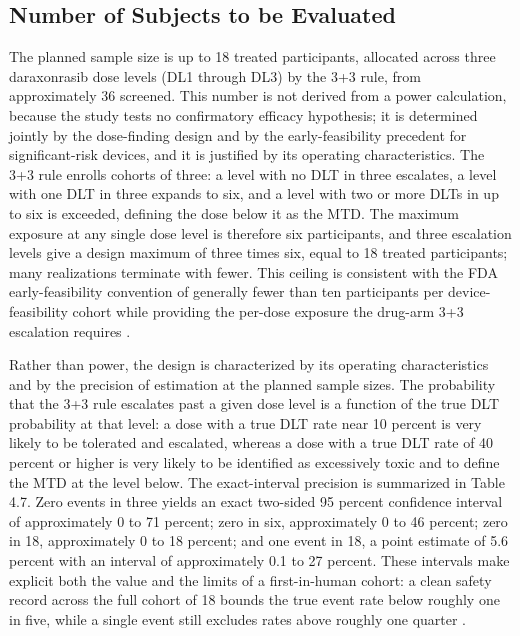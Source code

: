 \subsection{Number of Subjects to be Evaluated}

The planned sample size is up to 18 treated participants, allocated across three
daraxonrasib dose levels (DL1 through DL3) by the 3+3 rule, from approximately 36
screened. This number is not derived from a power calculation, because the study
tests no confirmatory efficacy hypothesis; it is determined jointly by the
dose-finding design and by the early-feasibility precedent for significant-risk
devices, and it is justified by its operating characteristics. The 3+3 rule enrolls
cohorts of three: a level with no DLT in three escalates, a level with one DLT in
three expands to six, and a level with two or more DLTs in up to six is exceeded,
defining the dose below it as the MTD. The maximum exposure at any single dose level
is therefore six participants, and three escalation levels give a design maximum of
three times six, equal to 18 treated participants; many realizations terminate with
fewer. This ceiling is consistent with the FDA early-feasibility convention of
generally fewer than ten participants per device-feasibility cohort while providing
the per-dose exposure the drug-arm 3+3 escalation requires \cite{phase1guidance}.

Rather than power, the design is characterized by its operating characteristics and
by the precision of estimation at the planned sample sizes. The probability that the
3+3 rule escalates past a given dose level is a function of the true DLT probability
at that level: a dose with a true DLT rate near 10 percent is very likely to be
tolerated and escalated, whereas a dose with a true DLT rate of 40 percent or higher
is very likely to be identified as excessively toxic and to define the MTD at the
level below. The exact-interval precision is summarized in Table 4.7. Zero events in
three yields an exact two-sided 95 percent confidence interval of approximately 0 to
71 percent; zero in six, approximately 0 to 46 percent; zero in 18, approximately 0
to 18 percent; and one event in 18, a point estimate of 5.6 percent with an interval
of approximately 0.1 to 27 percent. These intervals make explicit both the value and
the limits of a first-in-human cohort: a clean safety record across the full cohort
of 18 bounds the true event rate below roughly one in five, while a single event
still excludes rates above roughly one quarter \cite{phase1guidance,ichpaistduni}.


